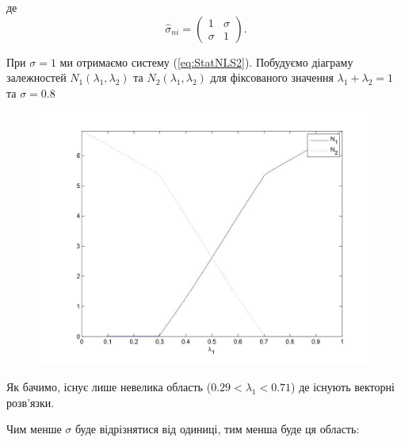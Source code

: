 де
\begin{equation}
\hat\sigma_{ni}=\begin{pmatrix} 1 & \sigma \\ \sigma & 1 \end{pmatrix}.
\end{equation}

При $\sigma=1$ ми отримаємо систему (\ref{eq:StatNLS2}).
Побудуємо діаграму залежностей $N_1(\lambda_1,\lambda_2)$ та $N_2(\lambda_1,\lambda_2)$ для фіксованого значення $\lambda_1+\lambda_2=1$ та $\sigma=0.8$

\begin{figure}[h]
  \centering
  \includegraphics[width=450pt]{fig2}
  \label{fig2}
\end{figure} 

Як бачимо, існує лише невелика область ($0.29<\lambda_1<0.71$) де існують векторні розв'язки.

Чим менше $\sigma$ буде відрізнятися від одиниці, тим менша буде ця область:

